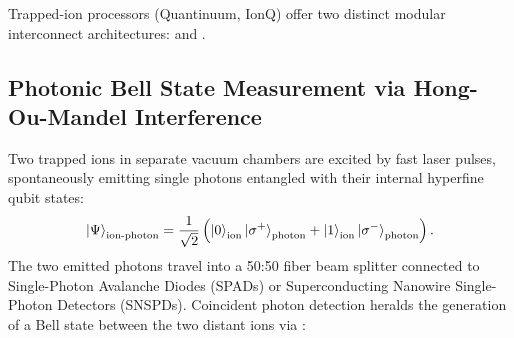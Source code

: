 Trapped-ion processors (Quantinuum, IonQ) offer two distinct modular interconnect architectures:  and .

\subsection{Photonic Bell State Measurement via Hong-Ou-Mandel Interference}
Two trapped ions in separate vacuum chambers are excited by fast laser pulses, spontaneously emitting single photons entangled with their internal hyperfine qubit states:
\begin{equation}
    \ket{\Psi}_{\text{ion-photon}} = \frac{1}{\sqrt{2}} \left( \ket{0}_{\text{ion}} \ket{\sigma^+}_{\text{photon}} + \ket{1}_{\text{ion}} \ket{\sigma^-}_{\text{photon}} \right).
\end{equation}
The two emitted photons travel into a 50:50 fiber beam splitter connected to Single-Photon Avalanche Diodes (SPADs) or Superconducting Nanowire Single-Photon Detectors (SNSPDs). Coincident photon detection heralds the generation of a Bell state between the two distant ions via :

